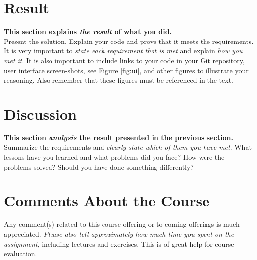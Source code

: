 \documentclass[a4paper]{scrartcl}
\begin{document}
\section{Result}

\textbf{This section explains \textit{the result} of what you did.} \\

\noindent Present the solution. Explain your code and prove that it meets the requirements. It is very important to \textit{state each requirement that is met} and explain \textit{how you met it}. It is also important to include links to your code in your Git repository, user interface screen-shots, see Figure \ref{fig:ui}, and other figures to illustrate your reasoning. Also remember that these figures must be referenced in the text.

\section{Discussion}

\textbf{This section \textit{analysis} the result presented in the previous section.} \\

\noindent Summarize the requirements and \textit{clearly state which of them you have met}. What lessons have you learned and what problems did you face? How were the problems solved? Should you have done something differently?

\section{Comments About the Course}

Any comment(s) related to this course offering or to coming offerings is much appreciated. \textit{Please also tell approximately how much time you spent on the assignment}, including lectures and exercises. This is of great help for course evaluation.
\end{document}

